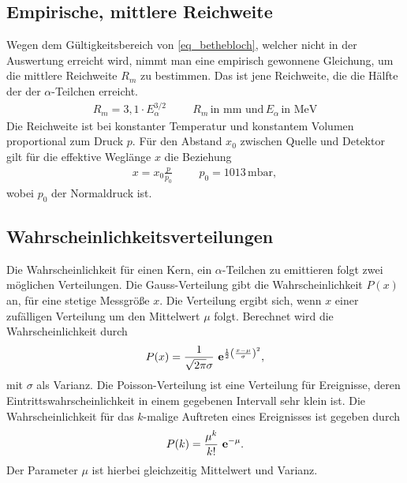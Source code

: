 \subsection{Empirische, mittlere Reichweite}
Wegen dem Gültigkeitsbereich von \eqref{eq_bethebloch}, welcher nicht in der Auswertung erreicht wird, nimmt man eine empirisch gewonnene
Gleichung, um die mittlere Reichweite $R_m$ zu bestimmen. Das ist jene Reichweite, die die Hälfte der der $\alpha$-Teilchen erreicht.
\begin{align}
 R_m = 3,1\cdot E^{3/2}_\alpha  \hspace{1cm} R_m \, \text{in mm und}\, E_\alpha\, \text{in MeV}
 \label{eq_reichweite_empirisch}
\end{align}
Die Reichweite ist bei konstanter Temperatur und konstantem Volumen proportional zum Druck $p$. Für den Abstand $x_0$ zwischen Quelle und Detektor
gilt für die effektive Weglänge $x$ die Beziehung
\begin{align}
 x = x_0 \frac{p}{p_0} \hspace{1cm} p_0 = 1013\, \text{mbar},
 \label{eq_reichweite_auswertung}
\end{align}
wobei $p_0$ der Normaldruck ist. 

\subsection{Wahrscheinlichkeitsverteilungen}
Die Wahrscheinlichkeit für einen Kern, ein $\alpha$-Teilchen zu emittieren folgt zwei möglichen Verteilungen. Die Gauss-Verteilung gibt
die Wahrscheinlichkeit $P(x)$ an, für eine stetige Messgröße $x$. Die Verteilung ergibt sich, wenn $x$ einer zufälligen Verteilung um den Mittelwert
$\mu$ folgt. Berechnet wird die Wahrscheinlichkeit durch
\begin{align}
 P(x) = \frac{1}{\sqrt{2\pi}\sigma} \ \mathbf{e}^{\frac12\left(\frac{x-\mu}{\sigma} \right)^2},
 \label{eq_gauss}
\end{align}
mit $\sigma$ als Varianz. Die Poisson-Verteilung ist eine Verteilung für Ereignisse, deren Eintrittswahrscheinlichkeit in einem gegebenen
Intervall sehr klein ist. Die Wahrscheinlichkeit für das $k$-malige Auftreten eines Ereignisses ist gegeben durch
\begin{align}
 P(k) = \frac{\mu^k}{k!}\ \mathbf{e}^{-\mu}.
 \label{eq_poisson}
\end{align}
Der Parameter $\mu$ ist hierbei gleichzeitig Mittelwert und Varianz.


